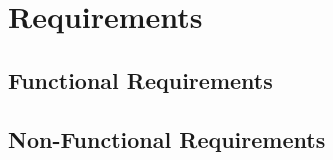 \chapter{Requirements}
\label{cha:requirements}

\section{Functional Requirements}
\label{sec:functional_requirements}

\section{Non-Functional Requirements}
\label{sec:nonfunctional_requirements}
